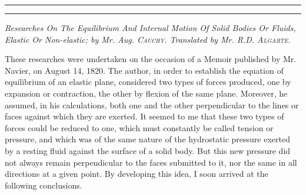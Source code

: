 \documentclass[openright,smallroyalvopaper,8pt,twoside,showtrims]{memoir}
\begin{document}
\vspace*{1.5cm}
\noindent
\rule{\textwidth}{0.5pt}\vspace*{-\baselineskip}\vspace*{2pt} 
\rule{\textwidth}{0.5pt} 
\vspace*{.2cm}
\begin{center}
\emph{Researches On The Equilibrium And Internal Motion Of Solid Bodies Or Fluids, Elastic Or Non-elastic; by Mr. Aug. {\normalfont\scshape Cauchy}. Translated by Mr. R.D. {\normalfont\scshape Algarte}.}
\end{center}
\normalfont
These researches were undertaken on the occasion of a Memoir published by Mr. Navier, on August 14, 1820. The author, in order to establish the equation of equilibrium of an elastic plane, considered two types of forces produced, one by expansion or contraction, the other by flexion of the same plane. Moreover, he assumed, in his calculations, both one and the other perpendicular to the lines or faces against which they are exerted. It seemed to me that these two types of forces could be reduced to one, which must constantly be called tension or pressure, and which was of the same nature of the hydrostatic pressure exerted by a resting fluid against the surface of a solid body. But this new pressure did not always remain perpendicular to the faces submitted to it, nor the same in all directions at a given point. By developing this idea, I soon arrived at the following conclusions. 
\end{document}
